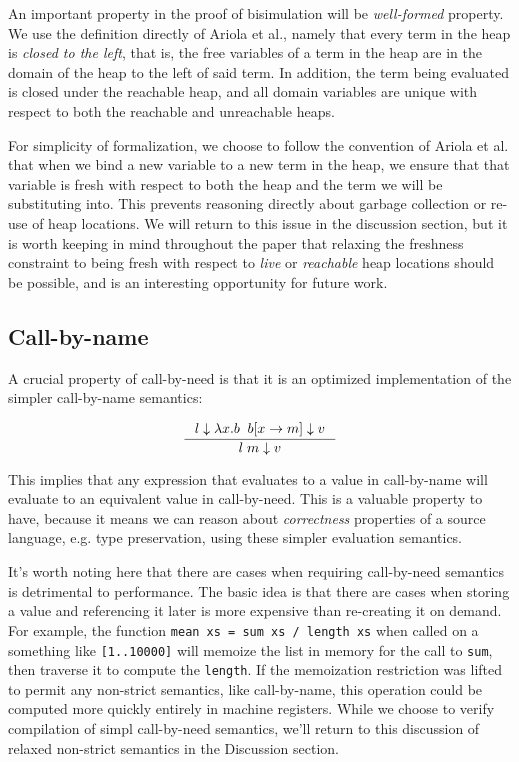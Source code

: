 An important property in the proof of bisimulation will be \emph{well-formed}
property. We use the definition directly of Ariola et al., namely that every
term in the heap is \emph{closed to the left}, that is, the free variables of a
term in the heap are in the domain of the heap to the left of said term. In
addition, the term being evaluated is closed under the reachable heap, and all
domain variables are unique with respect to both the reachable and unreachable
heaps. 

For simplicity of formalization, we choose to follow the convention of Ariola et
al. that when we bind a new variable to a new term in the heap, we ensure that
that variable is fresh with respect to both the heap and the term we will be
substituting into.  This prevents reasoning directly about garbage collection
or re-use of heap locations. We will return to this issue in the discussion
section, but it is worth keeping in mind throughout the paper that relaxing the
freshness constraint to being fresh with respect to \emph{live} or
\emph{reachable} heap locations should be possible, and is an interesting
opportunity for future work. 

\subsection{Call-by-name}
A crucial property of call-by-need is that it is an optimized implementation of
the simpler call-by-name semantics: 

\begin{align}
\inference{l \downarrow \lambda x. b \; \;  b [x \rightarrow m] \downarrow v}{l \; m \downarrow v}
\end{align}

This implies that any expression that evaluates to a value in call-by-name will
evaluate to an equivalent value in call-by-need. This is a valuable property to
have, because it means we can reason about \emph{correctness} properties of a
source language, e.g. type preservation, using these simpler evaluation
semantics. 

It's worth noting here that there are cases when requiring call-by-need
semantics is detrimental to performance. The basic idea is that there are cases
when storing a value and referencing it later is more expensive than re-creating
it on demand. For example, the function \texttt{mean xs = sum xs / length xs}
when called on a something like \texttt{[1..10000]} will memoize the list in
memory for the call to \texttt{sum}, then traverse it to compute the
\texttt{length}.  If the memoization restriction was lifted to permit any
non-strict semantics, like call-by-name, this operation could be computed more
quickly entirely in machine registers. While we choose to verify compilation of
simpl call-by-need semantics, we'll return to this discussion of relaxed
non-strict semantics in the Discussion section.

